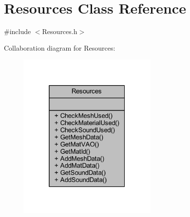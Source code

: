 \hypertarget{class_resources}{}\section{Resources Class Reference}
\label{class_resources}


{\ttfamily \#include $<$Resources.\+h$>$}



Collaboration diagram for Resources\+:
\nopagebreak
\begin{figure}[H]
\begin{center}
\leavevmode
\includegraphics[width=196pt]{class_resources__coll__graph}
\end{center}
\end{figure}
